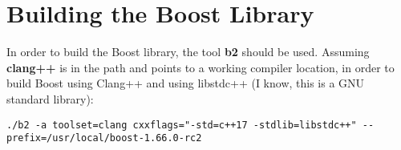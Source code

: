 \chapter{Building the Boost Library}

In order to build the Boost library, the tool \textbf{b2} should be used. Assuming \textbf{clang++} is in the path and points to a working compiler location, in order to build Boost using Clang++ and using libstdc++ (I know, this is a GNU standard library):

\begin{lstlisting}
./b2 -a toolset=clang cxxflags="-std=c++17 -stdlib=libstdc++" --prefix=/usr/local/boost-1.66.0-rc2
\end{lstlisting}
